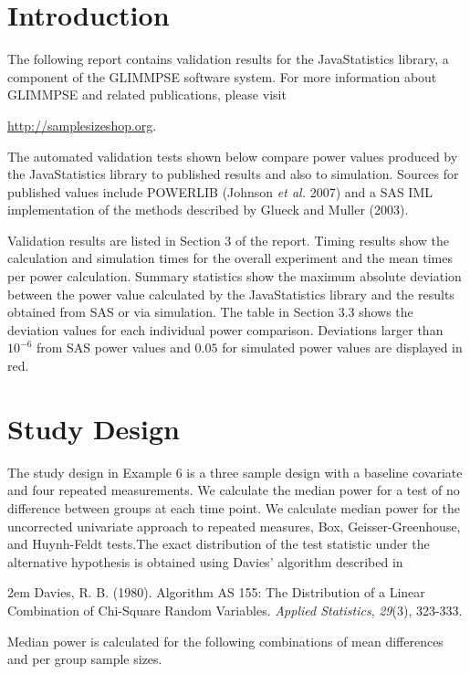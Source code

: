 \documentclass{glimmpse-report}
\begin{document}
\section{Introduction}
The following report contains validation results for the JavaStatistics library, a component of the GLIMMPSE software system.  For more information about GLIMMPSE and related publications, please visit

 

\href{http://samplesizeshop.org}{http://samplesizeshop.org}.

The automated validation tests shown below compare power values produced by the JavaStatistics library to published results and also to simulation.  Sources for published values include POWERLIB (Johnson \emph{et al.} 2007) and a SAS IML implementation of the methods described by Glueck and Muller (2003).

Validation results are listed in Section 3 of the report.  Timing results show the calculation and simulation times for the overall experiment and the mean times per power calculation.  Summary statistics show the maximum absolute deviation between the power value calculated by the JavaStatistics library and the results obtained from SAS or via simulation.  The table in Section 3.3 shows the deviation values for each individual power comparison.  Deviations larger than $10^{-6}$ from SAS power values and $0.05$ for simulated power values are displayed in red.

 \section{Study Design}
The study design in Example 6 is a three sample design with a baseline covariate and four repeated measurements.  We calculate the median power for a test of no difference between groups at each time point.  We calculate median power for the uncorrected univariate approach to repeated measures, Box, Geisser-Greenhouse, and Huynh-Feldt tests.The exact distribution of the test statistic under the alternative hypothesis is obtained using Davies' algorithm described in 

\hangindent2em
 Davies, R. B. (1980). Algorithm AS 155: The Distribution of a Linear Combination of Chi-Square Random Variables. \emph{Applied Statistics}, \emph{29}(3), 323-333.

Median power is calculated for the following combinations of mean differences and per group sample sizes.
\end{document}
